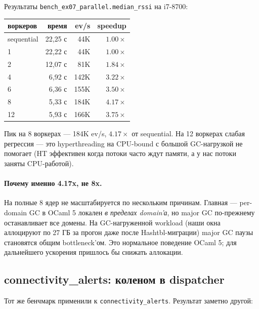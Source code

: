 Результаты \texttt{bench\_ex07\_parallel.median\_rssi} на i7-8700:

\begin{center}
\begin{tabular}{lrrr}
\textbf{воркеров} & \textbf{время} & \textbf{ev/s} & \textbf{speedup} \\
\hline
sequential & 22{,}25 с & 44K & $1.00\times$ \\
1          & 22{,}22 с & 44K & $1.00\times$ \\
2          & 12{,}07 с & 81K & $1.84\times$ \\
4          &  6{,}92 с & 142K & $3.22\times$ \\
6          &  6{,}36 с & 155K & $3.50\times$ \\
8          &  5{,}33 с & 184K & $\mathbf{4.17\times}$ \\
12         &  5{,}93 с & 166K & $3.75\times$ \\
\end{tabular}
\end{center}

Пик на 8 воркерах --- 184K ev/s, $4.17 \times$ от sequential. На 12
воркерах слабая регрессия --- это hyperthreading на CPU-bound с
большой GC-нагрузкой не помогает (HT эффективен когда потоки часто
ждут памяти, а у нас потоки заняты CPU-работой).

\paragraph{Почему именно 4.17x, не 8x.} На полные 8 ядер не
масштабируется по нескольким причинам. Главная --- per-domain GC в
OCaml 5 локален \emph{в пределах domain'а}, но major GC по-прежнему
останавливает все домены. На GC-нагруженной workload (наши окна
аллоцируют по 27 ГБ за прогон даже после Hashtbl-миграции) major
GC паузы становятся общим bottleneck'ом. Это нормальное поведение
OCaml 5; для дальнейшего ускорения пришлось бы снижать
аллокации.

\subsection{connectivity\_alerts: коленом в dispatcher}

Тот же бенчмарк применили к \texttt{connectivity\_alerts}.
Результат заметно другой:

